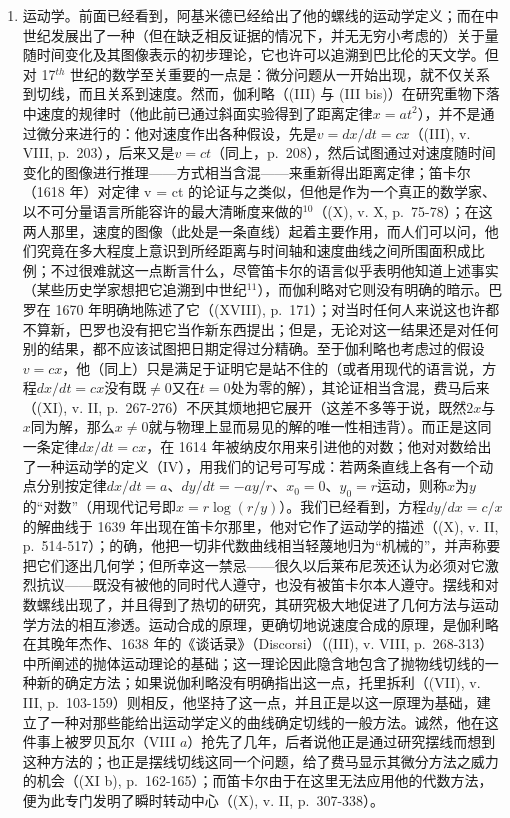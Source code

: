 \begin{enumerate}
\def\labelenumi{\Alph{enumi})}
\setcounter{enumi}{1}
\tightlist
\item
  运动学。前面已经看到，阿基米德已经给出了他的螺线的运动学定义；而在中世纪发展出了一种（但在缺乏相反证据的情况下，并无无穷小考虑的）关于量随时间变化及其图像表示的初步理论，它也许可以追溯到巴比伦的天文学。但对 17\(^{th}\) 世纪的数学至关重要的一点是：微分问题从一开始出现，就不仅关系到切线，而且关系到速度。然而，伽利略（(III) 与 (III bis)）在研究重物下落中速度的规律时（他此前已通过斜面实验得到了距离定律\(x = at^{2}\)），并不是通过微分来进行的：他对速度作出各种假设，先是\(v = dx/dt = cx\)（(III), v. VIII, p.~203），后来又是\(v = ct\)（同上，p.~208），然后试图通过对速度随时间变化的图像进行推理——方式相当含混——来重新得出距离定律；笛卡尔（1618 年）对定律 v = ct 的论证与之类似，但他是作为一个真正的数学家、以不可分量语言所能容许的最大清晰度来做的\(^{10}\)（(X), v. X, p.~75-78）；在这两人那里，速度的图像（此处是一条直线）起着主要作用，而人们可以问，他们究竟在多大程度上意识到所经距离与时间轴和速度曲线之间所围面积成比例；不过很难就这一点断言什么，尽管笛卡尔的语言似乎表明他知道上述事实（某些历史学家想把它追溯到中世纪\(^{11}\)），而伽利略对它则没有明确的暗示。巴罗在 1670 年明确地陈述了它（(XVIII), p.~171）；对当时任何人来说这也许都不算新，巴罗也没有把它当作新东西提出；但是，无论对这一结果还是对任何别的结果，都不应该试图把日期定得过分精确。至于伽利略也考虑过的假设\(v = cx\)，他（同上）只是满足于证明它是站不住的（或者用现代的语言说，方程\(dx/dt = cx\)没有既\(\neq 0\)又在\(t = 0\)处为零的解），其论证相当含混，费马后来（(XI), v. II, p.~267-276）不厌其烦地把它展开（这差不多等于说，既然\(2x\)与\(x\)同为解，那么\(x \neq 0\)就与物理上显而易见的解的唯一性相违背）。而正是这同一条定律\(dx/dt = cx\)，在 1614 年被纳皮尔用来引进他的对数；他对对数给出了一种运动学的定义（IV），用我们的记号可写成：若两条直线上各有一个动点分别按定律\(dx/dt = a\)、\(dy/dt = -ay/r\)、\(x_0 = 0\)、\(y_0 = r\)运动，则称\(x\)为\(y\)的“对数”（用现代记号即\(x = r \log(r/y)\)）。我们已经看到，方程\(dy/dx = c/x\)的解曲线于 1639 年出现在笛卡尔那里，他对它作了运动学的描述（(X), v. II, p.~514-517）；的确，他把一切非代数曲线相当轻蔑地归为“机械的”，并声称要把它们逐出几何学；但所幸这一禁忌——很久以后莱布尼茨还认为必须对它激烈抗议——既没有被他的同时代人遵守，也没有被笛卡尔本人遵守。摆线和对数螺线出现了，并且得到了热切的研究，其研究极大地促进了几何方法与运动学方法的相互渗透。运动合成的原理，更确切地说速度合成的原理，是伽利略在其晚年杰作、1638 年的《谈话录》（Discorsi）（(III), v. VIII, p.~268-313）中所阐述的抛体运动理论的基础；这一理论因此隐含地包含了抛物线切线的一种新的确定方法；如果说伽利略没有明确指出这一点，托里拆利（(VII), v. III, p.~103-159）则相反，他坚持了这一点，并且正是以这一原理为基础，建立了一种对那些能给出运动学定义的曲线确定切线的一般方法。诚然，他在这件事上被罗贝瓦尔（VIII \(a\)）抢先了几年，后者说他正是通过研究摆线而想到这种方法的；也正是摆线切线这同一个问题，给了费马显示其微分方法之威力的机会（(XI b), p.~162-165）；而笛卡尔由于在这里无法应用他的代数方法，便为此专门发明了瞬时转动中心（(X), v. II, p.~307-338）。
\end{enumerate}


